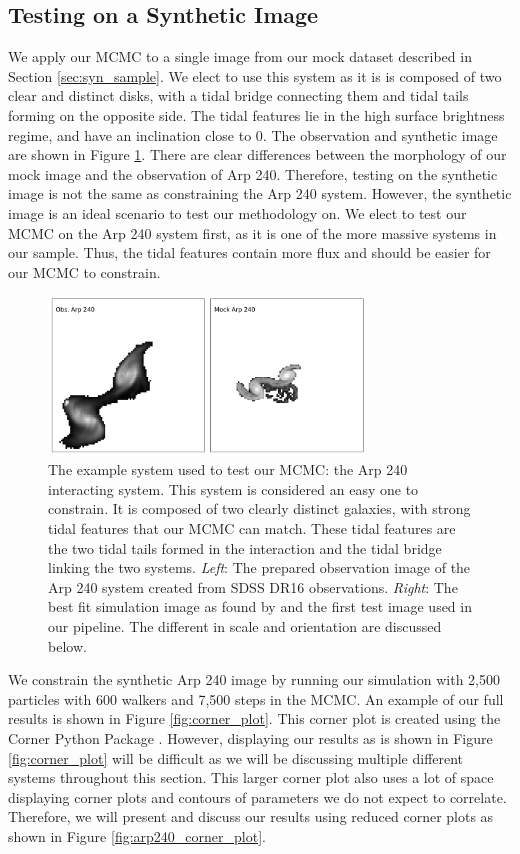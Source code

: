 \subsection{Testing on a Synthetic Image}
We apply our MCMC to a single image from our mock dataset described in Section \ref{sec:syn_sample}. We elect to use this system as it is is composed of two clear and distinct disks, with a tidal bridge connecting them and tidal tails forming on the opposite side. The tidal features lie in the high surface brightness regime, and have an inclination close to 0. The observation and synthetic image are shown in Figure \ref{fig:arp240}. There are clear differences between the morphology of our mock image and the observation of Arp 240. Therefore, testing on the synthetic image is not the same as constraining the Arp 240 system. However, the synthetic image is an ideal scenario to test our methodology on. We elect to test our MCMC on the Arp 240 system first, as it is one of the more massive systems in our sample. Thus, the tidal features contain more flux and should be easier for our MCMC to constrain.

\begin{figure}
    \centering
    \includegraphics[width=0.75\textwidth]{Chapter1/figures/arp240-obs-sim.pdf}
    \caption{The example system used to test our MCMC: the Arp 240 interacting system. This system is considered an easy one to constrain. It is composed of two clearly distinct galaxies, with strong tidal features that our MCMC can match. These tidal features are the two tidal tails formed in the interaction and the tidal bridge linking the two systems. \textit{Left}: The prepared observation image of the Arp 240 system created from SDSS DR16 observations. \textit{Right}: The best fit simulation image as found by \citet{2016MNRAS.459..720H} and the first test image used in our pipeline. The different in scale and orientation are discussed below.}
    \label{fig:arp240}
\end{figure}

We constrain the synthetic Arp 240 image by running our simulation with 2,500 particles with 600 walkers and 7,500 steps in the MCMC. An example of our full results is shown in Figure \ref{fig:corner_plot}. This corner plot is created using the Corner Python Package \citep{corner}. However, displaying our results as is shown in Figure \ref{fig:corner_plot} will be difficult as we will be discussing multiple different systems throughout this section. This larger corner plot also uses a lot of space displaying corner plots and contours of parameters we do not expect to correlate. Therefore, we will present and discuss our results using reduced corner plots as shown in Figure \ref{fig:arp240_corner_plot}.


